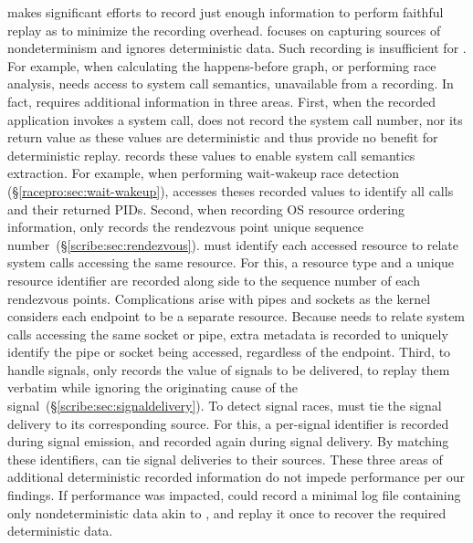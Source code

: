 \scribe makes significant efforts to record just enough information
to perform faithful replay as to minimize the recording overhead.
\scribe focuses on capturing sources of nondeterminism and
ignores deterministic data.
Such recording is insufficient for \racepro.
For example, when calculating the happens-before graph, or performing race
analysis, \racepro needs access to system call semantics, unavailable from
a \scribe recording. In fact, \racepro requires additional information in
three areas. First, when the recorded application invokes a system call, \scribe
does not record the system call number, nor its return value as these values are
deterministic and thus provide no benefit for deterministic replay.
\racepro records these values to enable system call semantics extraction.
For example, when performing wait-wakeup race detection
(\S\ref{racepro:sec:wait-wakeup}), \racepro accesses theses recorded values to
identify all  calls and their returned PIDs.
Second, when recording OS resource ordering information, \scribe only records
the rendezvous point unique sequence number~(\S\ref{scribe:sec:rendezvous}).
\racepro must identify each accessed resource to relate
system calls accessing the same resource. For this, a resource type and a unique resource
identifier are recorded along side to the sequence number of each rendezvous
points. Complications arise with pipes and sockets as the kernel considers each
endpoint to be a separate resource. Because \racepro needs to
relate system calls accessing the same socket or pipe, extra metadata is recorded to
uniquely identify the pipe or socket being accessed, regardless of the endpoint.
Third, to handle signals, \scribe only records the value of signals to be delivered,
to replay them verbatim while ignoring the originating cause of the
signal~(\S\ref{scribe:sec:signaldelivery}).
To detect signal races, \racepro must tie the signal delivery to its
corresponding source. For this, a per-signal identifier is recorded during
signal emission, and recorded again during signal delivery.
By matching these identifiers, \racepro can tie signal deliveries to their sources.
These three areas of additional deterministic recorded information do not impede
performance per our findings. If performance was impacted, \racepro could
record a minimal log file containing only nondeterministic data akin to \scribe,
and replay it once to recover the required deterministic data.

